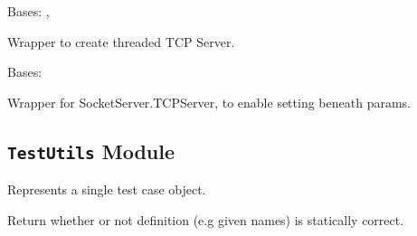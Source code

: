 \documentclass[letterpaper,10pt,english]{sphinxmanual}
\begin{document}

\begin{fulllineitems}
\label{ref-manual/XrdTest:XrdTest.TCPServer.ThreadedTCPServer}
Bases: , {\hyperref[ref-manual/XrdTest:XrdTest.TCPServer.XrdTCPServer]{}}

Wrapper to create threaded TCP Server.

\end{fulllineitems}


\begin{fulllineitems}
\label{ref-manual/XrdTest:XrdTest.TCPServer.XrdTCPServer}
Bases: 

Wrapper for SocketServer.TCPServer, to enable setting beneath params.

\begin{fulllineitems}
\label{ref-manual/XrdTest:XrdTest.TCPServer.XrdTCPServer.allow_reuse_address}
\end{fulllineitems}


\end{fulllineitems}



\subsection{\texttt{TestUtils} Module}
\label{ref-manual/XrdTest:module-XrdTest.TestUtils}\label{ref-manual/XrdTest:testutils-module}

\begin{fulllineitems}
\label{ref-manual/XrdTest:XrdTest.TestUtils.TestCase}
Represents a single test case object.

\begin{fulllineitems}
\label{ref-manual/XrdTest:XrdTest.TestUtils.TestCase.validateStatic}
Return whether or not definition (e.g given names) is statically correct.

\end{fulllineitems}


\end{fulllineitems}
\end{document}
